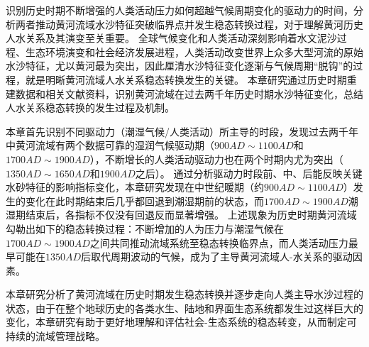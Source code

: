 识别历史时期不断增强的人类活动压力如何超越气候周期变化的驱动力的时间，分析两者推动黄河流域水沙特征突破临界点并发生稳态转换过程，对于理解黄河历史人水关系及其演变至关重要。
全球气候变化和人类活动深刻影响着水文泥沙过程、生态环境演变和社会经济发展进程，人类活动改变世界上众多大型河流的原始水沙特征，尤以黄河最为突出，因此厘清水沙特征变化逐渐与气候周期“脱钩”的过程，就是明晰黄河流域人水关系稳态转换发生的关键。
本章研究通过历史时期重建数据和相关文献资料，识别黄河流域在过去两千年历史时期水沙特征变化，总结人水关系稳态转换的发生过程及机制。

本章首先识别不同驱动力（潮湿气候/人类活动）所主导的时段，发现过去两千年中黄河流域有两个数据可靠的湿润气候驱动期（$900AD\sim1100AD$和$1700AD\sim1900AD$），不断增长的人类活动驱动力也在两个时期内尤为突出（$1350AD \sim 1650AD$和$1900AD$之后）。
通过分析驱动力时段前、中、后能反映关键水砂特征的影响指标变化，本章研究发现在中世纪暖期（约$900AD \sim 1100AD$）发生的变化在此时期结束后几乎都回退到潮湿期前的状态，而$1700AD \sim 1900AD$潮湿期结束后，各指标不仅没有回退反而显著增强。
上述现象为历史时期黄河流域勾勒出如下的稳态转换过程：不断增加的人为压力与潮湿气候在$1700AD \sim 1900AD$之间共同推动流域系统至稳态转换临界点，而人类活动压力最早可能在$1350AD$后取代周期波动的气候，成为了主导黄河流域人-水关系的驱动因素。

本章研究分析了黄河流域在历史时期发生稳态转换并逐步走向人类主导水沙过程的状态，由于在整个地球历史的各类水生、陆地和界面生态系统都发生过这样巨大的变化，本章研究有助于更好地理解和评估社会-生态系统的稳态转变，从而制定可持续的流域管理战略。
